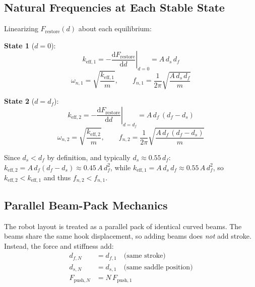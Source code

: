 \documentclass[11pt,letterpaper]{article}
\newcommand{\diff}{\mathrm{d}}
\begin{document}
\subsection{Natural Frequencies at Each Stable State}
\label{ssec:natfreq2}

Linearizing $F_{\mathrm{restore}}(d)$ about each equilibrium:

\textbf{State 1} ($d = 0$):
\begin{equation}
  k_{\mathrm{eff,1}} = \left.-\frac{\diff F_{\mathrm{restore}}}{\diff d}\right|_{d=0}
  = A\,d_s\,d_f
  \label{eq:keff1}
\end{equation}
\begin{equation}
  \omega_{n,1} = \sqrt{\frac{k_{\mathrm{eff,1}}}{m}}, \qquad
  f_{n,1} = \frac{1}{2\pi}\sqrt{\frac{A\,d_s\,d_f}{m}}
  \label{eq:fn1}
\end{equation}

\textbf{State 2} ($d = d_f$):
\begin{equation}
  k_{\mathrm{eff,2}} = \left.-\frac{\diff F_{\mathrm{restore}}}{\diff d}\right|_{d=d_f}
  = A\,d_f\,(d_f - d_s)
  \label{eq:keff2}
\end{equation}
\begin{equation}
  \omega_{n,2} = \sqrt{\frac{k_{\mathrm{eff,2}}}{m}}, \qquad
  f_{n,2} = \frac{1}{2\pi}\sqrt{\frac{A\,d_f\,(d_f - d_s)}{m}}
  \label{eq:fn2}
\end{equation}

Since $d_s < d_f$ by definition, and typically $d_s \approx 0.55\,d_f$:
$k_{\mathrm{eff,2}} = A\,d_f(d_f-d_s) \approx 0.45\,A\,d_f^2$, while
$k_{\mathrm{eff,1}} = A\,d_s\,d_f \approx 0.55\,A\,d_f^2$, so
$k_{\mathrm{eff,2}} < k_{\mathrm{eff,1}}$ and thus $f_{n,2} < f_{n,1}$.

\subsection{Parallel Beam-Pack Mechanics}
\label{ssec:stacked}

The robot layout is treated as a parallel pack of identical curved beams. The
beams share the same hook displacement, so adding beams does \emph{not} add
stroke. Instead, the force and stiffness add:
\begin{align}
  d_{f,N} &= d_{f,1} \quad\text{(same stroke)} \label{eq:stackstroke}\\
  d_{s,N} &= d_{s,1} \quad\text{(same saddle position)} \label{eq:stacksaddle}\\
  F_{\mathrm{push},N} &= N\,F_{\mathrm{push},1}
\end{align}
\end{document}
